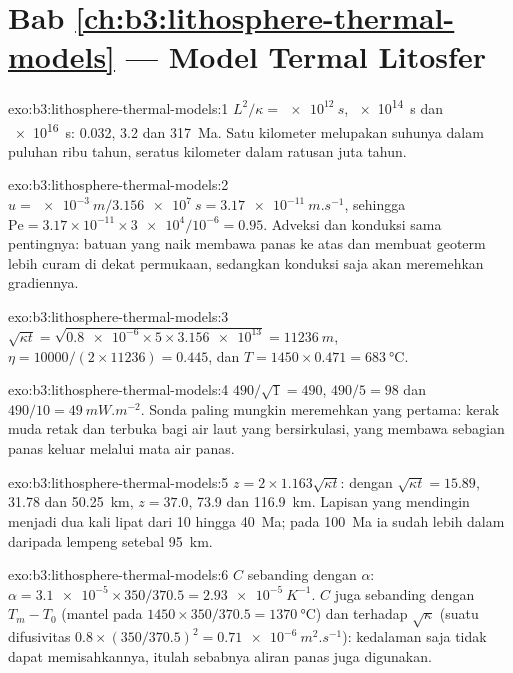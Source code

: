 \section*{Bab \ref{ch:b3:lithosphere-thermal-models} --- Model Termal Litosfer}

\begin{solution}{exo:b3:lithosphere-thermal-models:1}
$L^2/\kappa = \qty{e12}{s}$, \qty{e14}{s} dan \qty{e16}{s}: 0.032, 3.2 dan
\qty{317}{Ma}. Satu kilometer melupakan suhunya dalam puluhan ribu
tahun, seratus kilometer dalam ratusan juta tahun.
\end{solution}

\begin{solution}{exo:b3:lithosphere-thermal-models:2}
$u = \qty{e-3}{m}/\qty{3.156e7}{s} = \qty{3.17e-11}{m.s^{-1}}$, sehingga
$\mathrm{Pe} = 3.17\times10^{-11}\times\num{3e4}/10^{-6} = 0.95$. Adveksi dan
konduksi sama pentingnya: batuan yang naik membawa panas ke atas
dan membuat geoterm lebih curam di dekat permukaan, sedangkan konduksi saja akan
meremehkan gradiennya.
\end{solution}

\begin{solution}{exo:b3:lithosphere-thermal-models:3}
$\sqrt{\kappa t} = \sqrt{\num{0.8e-6}\times5\times\num{3.156e13}} =
\qty{11236}{m}$, $\eta = 10000/(2\times11236) = 0.445$, dan $T = 1450\times0.471
= \qty{683}{\celsius}$.
\end{solution}

\begin{solution}{exo:b3:lithosphere-thermal-models:4}
$490/\sqrt1 = 490$, $490/5 = 98$ dan $490/10 = \qty{49}{mW.m^{-2}}$. Sonda
paling mungkin meremehkan yang pertama: kerak muda retak dan terbuka bagi
air laut yang bersirkulasi, yang membawa sebagian panas keluar melalui mata air panas.
\end{solution}

\begin{solution}{exo:b3:lithosphere-thermal-models:5}
$z = 2\times1.163\sqrt{\kappa t}$: dengan $\sqrt{\kappa t} = 15.89$, 31.78 dan
\qty{50.25}{km}, $z = 37.0$, 73.9 dan \qty{116.9}{km}. Lapisan yang mendingin
menjadi dua kali lipat dari 10 hingga \qty{40}{Ma}; pada \qty{100}{Ma} ia sudah
lebih dalam daripada lempeng setebal \qty{95}{km}.
\end{solution}

\begin{solution}{exo:b3:lithosphere-thermal-models:6}
$C$ sebanding dengan $\alpha$: $\alpha = \num{3.1e-5}\times350/370.5 =
\qty{2.93e-5}{K^{-1}}$. $C$ juga sebanding dengan $T_m - T_0$ (mantel pada
$1450\times350/370.5 = \qty{1370}{\celsius}$) dan terhadap $\sqrt\kappa$ (suatu
difusivitas $0.8\times(350/370.5)^2 = \qty{0.71e-6}{m^2.s^{-1}}$): kedalaman saja
tidak dapat memisahkannya, itulah sebabnya aliran panas juga digunakan.
\end{solution}

